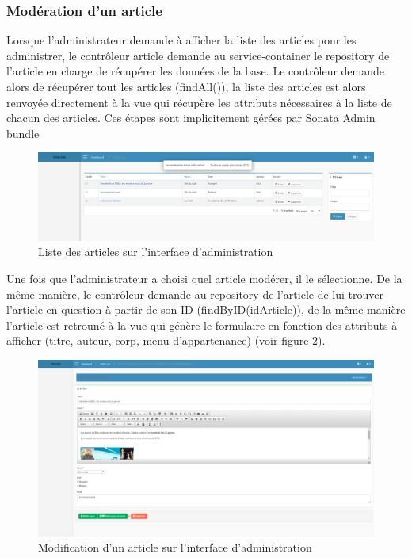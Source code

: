\documentclass[a4paper,12pt, notitlepage]{report}
\begin{document}
\subsubsection{Modération d'un article}
Lorsque l’administrateur demande à afficher la liste des articles pour les administrer, le contrôleur article demande au \gls{service-container} le \gls{repository} de l'article en charge de récupérer les données de la base. Le contrôleur demande alors de récupérer tout les articles (findAll()), la liste des articles est alors renvoyée directement à la vue qui récupère les attributs nécessaires à la liste de chacun des articles. Ces étapes sont implicitement gérées par Sonata Admin \gls{bundle}
\begin{figure} 
    \caption{Liste des articles sur l'interface d'administration}  
    \label{liste-article}
    \centering
    \includegraphics[scale=0.3]{images/liste-article.png}
\end{figure}

Une fois que l’administrateur a choisi quel article modérer, il le sélectionne. De la même manière, le contrôleur demande au \gls{repository} de l'article de lui trouver l’article en question à partir de son ID (findByID(idArticle)), de la même manière l’article est retrouné à la vue qui génère le formulaire en fonction des attributs à afficher (titre, auteur, corp, menu d’appartenance) (voir figure \ref{modif-article}).

\begin{figure} 
    \caption{Modification d'un article sur l'interface d'administration}  
    \label{modif-article}
    \centering
    \includegraphics[scale=0.3]{images/modif-article.png}
\end{figure}
\end{document}
